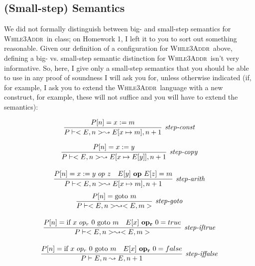 \documentclass[11pt]{article}
\def\WhileThAddr{\textsc{While3Addr}}
\begin{document}
\subsection{(Small-step) Semantics}

We did not formally distinguish between big- and small-step semantics for \WhileThAddr\ in class; on Homework 1, I left it to you to sort out something reasonable.  Given our definition of a configuration for \WhileThAddr\ above, defining a big- vs. small-step semantic distinction for \WhileThAddr\ isn't very informative.  So, here, I give only a small-step semantics that you should be able to use in any proof of soundness I will ask you for, unless otherwise indicated (if, for example, I ask you to extend the \WhileThAddr\ language with a new construct, for example, these will not suffice and you will have to extend the semantics):

\[
\infer[\textit{step-const}]{P \vdash <E,n> \leadsto E[x \mapsto m],n+1}{P[n] = x := m}
\]

\[
\begin{array}{c}
\infer[\textit{step-copy}]
	{P \vdash <E,n> \leadsto E[x \mapsto E[y]],n+1}
	{P[n] = x := y}\\[3ex]
	\infer[\textit{step-arith}]
	{P \vdash <E, n> \leadsto E[x \mapsto m],n+1}
	{P[n] = x := y ~op~ z & E[y] ~\mathbf{op}~ E[z] = m}\\
\end{array}
\]
\[
\begin{array}{c}	

\infer[\textit{step-goto}]
	{P \vdash <E,n> \leadsto <E,m>}
	{P[n] = \mbox{goto}~m}\\[3ex]
	
\infer[\textit{step-iftrue}]
	{P \vdash <E,n> \leadsto <E,m>}
	{P[n] = \mbox{if}~x~op_r~0~\mbox{goto}~m & E[x] ~\mathbf{op_r}~ 0 = true}\\[3ex]
	
\infer[\textit{step-iffalse}]
	{P \vdash E,n \leadsto E,n+1}
	{P[n] = \mbox{if}~x~op_r~0~\mbox{goto}~m & E[x] ~\mathbf{op_r}~ 0 = false}\\[3ex]
	
\end{array}
\]
\end{document}
